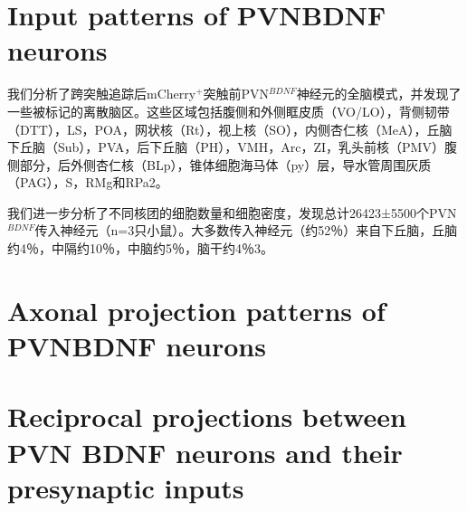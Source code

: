 \section{Input patterns of PVNBDNF neurons}
我们分析了跨突触追踪后mCherry$^{+}$突触前PVN$^{BDNF}$神经元的全脑模式，并发现了一些被标记的离散脑区。这些区域包括腹侧和外侧眶皮质（VO/LO），背侧韧带（DTT），LS，POA，网状核（Rt），视上核（SO），内侧杏仁核（MeA），丘脑下丘脑（Sub），PVA，后下丘脑（PH），VMH，Arc，ZI，乳头前核（PMV）腹侧部分，后外侧杏仁核（BLp），锥体细胞海马体（py）层，导水管周围灰质（PAG），S，RMg和RPa\figurename{2}。

我们进一步分析了不同核团的细胞数量和细胞密度，发现总计26423±5500个PVN$^{BDNF}$传入神经元（n=3只小鼠）。大多数传入神经元（约52％）来自下丘脑，丘脑约4％，中隔约10％，中脑约5％，脑干约4％\figurename{3}。

\section{Axonal projection patterns of PVNBDNF neurons}


\section{Reciprocal projections between PVN BDNF neurons and their presynaptic inputs}